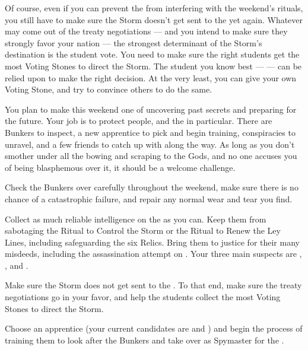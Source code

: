 \documentclass[char]{GL2020}
\begin{document}
Of course, even if you can prevent the \pGoaties{} from interfering with the weekend's rituals, you still have to make sure the Storm doesn't get sent to the \pShip{} yet again. Whatever may come out of the treaty negotiations — and you intend to make sure they strongly favor your nation — the strongest determinant of the Storm’s destination is the student vote. You need to make sure the right students get the most Voting Stones to direct the Storm. The \pShippie{} student you know best — \cInitiate{} — can be relied upon to make the right decision. At the very least, you can give \cInitiate{} your own Voting Stone, and try to convince others to do the same.

You plan to make this weekend one of uncovering past secrets and preparing for the future. Your job is to protect people, and the \pShippies{} in particular. There are Bunkers to inspect, a new apprentice to pick and begin training, conspiracies to unravel, and a few friends to catch up with along the way. As long as you don't smother under all the bowing and scraping to the Gods, and no one accuses you of being blasphemous over it, it should be a welcome challenge.

\begin{itemz}
    \item Check the Bunkers over carefully throughout the weekend, make sure there is no chance of a catastrophic failure, and repair any normal wear and tear you find.
    \item Collect as much reliable intelligence on the \pGoaties{} as you can. Keep them from sabotaging the Ritual to Control the Storm or the Ritual to Renew the Ley Lines, including safeguarding the six Relics. Bring them to justice for their many misdeeds, including the assassination attempt on \cHeadDiplomat{}. Your three main suspects are \cChupLeader{}, \cJuniorStatesman{}, and \cEbbPriest{}.
    \item Make sure the Storm does not get sent to the \pShip{}. To that end, make sure the treaty negotiations go in your favor, and help the \pShippie{} students collect the most Voting Stones to direct the Storm.
    \item Choose an apprentice (your current candidates are \cTechStar{} and \cInitiate{}) and begin the process of training them to look after the Bunkers and take over as Spymaster for the \pShippies{}.
\end{itemz}
\end{document}
